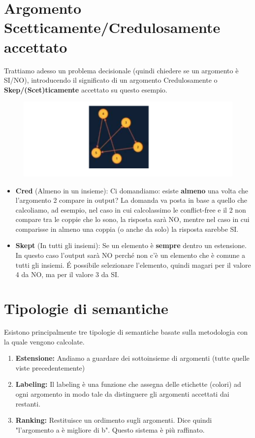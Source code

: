     \section{Argomento Scetticamente/Credulosamente accettato}
    Trattiamo adesso un problema decisionale (quindi chiedere se un argomento è
    SI/NO), introducendo il significato di un argomento Credulosamente o
    \textbf{Skep/(Scet)ticamente }accettato su questo esempio.
    \begin{figure}[htp]
        \centering
        \includegraphics[width=14cm, keepaspectratio]{img/Cap6/scet.png}
    \end{figure}
    \begin{itemize}
        \item \textbf{Cred} (Almeno in un insieme): Ci domandiamo: esiste
              \textbf{almeno} una volta che l'argomento 2 compare in output? La
              domanda va posta in base a quello che calcoliamo, ad esempio, nel caso
              in cui calcolassimo le conflict-free e il 2 non compare tra le coppie
              che lo sono, la risposta sarà NO, mentre nel caso in cui comparisse in
              almeno una coppia (o anche da solo) la risposta sarebbe SI.
        \item \textbf{Skept} (In tutti gli insiemi): Se un elemento è
              \textbf{sempre} dentro un estensione. In questo caso l'output sarà NO
              perché non c'è un elemento che è comune a tutti gli insiemi. É possibile
              selezionare l'elemento, quindi magari per il valore 4 da NO, ma per il
              valore 3 da SI.
    \end{itemize}

    \section{Tipologie di semantiche}
    Esistono principalmente tre tipologie di semantiche basate sulla metodologia
    con la quale vengono calcolate.
    \begin{enumerate}
        \item \textbf{Estensione:} Andiamo a guardare dei sottoinsieme di
              argomenti (tutte quelle viste precedentemente)
        \item \textbf{Labeling:} Il labeling è una funzione che assegna delle
              etichette (colori) ad ogni argomento in modo tale da distinguere gli
              argomenti accettati dai restanti.
        \item \textbf{Ranking:} Restituisce un ordimento sugli argomenti. Dice
              quindi "l'argomento a è migliore di b". Questo sistema è più raffinato.
    \end{enumerate}
